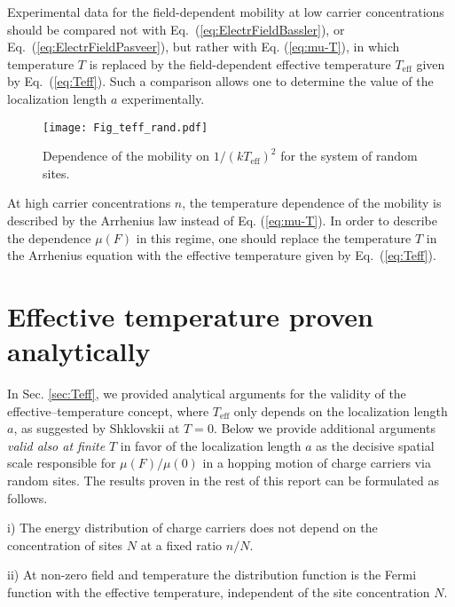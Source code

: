 \documentclass[aps,reprint,amsmath,amssymb,superscriptaddress,showpacs,prb]{revtex4-1}
\renewcommand{\alpha}{ a }
\begin{document}
Experimental data for the field-dependent mobility at low carrier concentrations should be compared not with Eq.~(\ref{eq:ElectrFieldBassler}), or Eq.~(\ref{eq:ElectrFieldPasveer}), but rather with Eq. (\ref{eq:mu-T}), in which temperature $T$ is replaced by the field-dependent effective temperature $T_{\text{eff}}$ given by Eq.~(\ref{eq:Teff}).  Such a comparison allows one to determine the value of the localization length $\alpha$ experimentally.

\begin{figure}
	\texttt{[image: Fig\_teff\_rand.pdf]}
	\caption{Dependence of the mobility on $1/(kT_{\text{eff}})^{2}$ for the system of random sites.}
	\label{fig:T_eff}
\end{figure}

At high carrier concentrations $n$, the temperature dependence of the mobility is described \cite{Baranovskii2002a,Baranovski2006,Baranovskii2014,Nenashev_Topical_2015} by the Arrhenius law instead of Eq. (\ref{eq:mu-T}). In order to describe the dependence $\mu(F)$ in this regime, one should replace the temperature $T$ in the Arrhenius equation with the effective temperature given by Eq.~(\ref{eq:Teff}).


\section{Effective temperature proven analytically}
\label{sec:Teff analytical}

In Sec. \ref{sec:Teff}, we provided analytical arguments for the validity of the effective--temperature concept, where $T_{\text{eff}}$ only depends on the localization length $a$, as suggested by Shklovskii \cite{Shklovskii1973} at $T=0$. Below we provide additional arguments \textit{valid also at finite }$T$ in favor of the localization length $\alpha$ as the decisive spatial scale responsible for $\mu(F)/\mu(0)$ in a hopping motion of charge carriers via random sites. The results proven in the rest of this report can be formulated as follows.

i) The energy distribution of charge carriers does not depend on the concentration of sites $N$ at a fixed ratio $n/N$.

ii) At non-zero field and temperature the distribution function is the Fermi function with the effective temperature, independent of the site concentration $N$.
\end{document}

